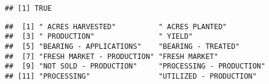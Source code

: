\documentclass[
]{article}
\newenvironment{Shaded}{\begin{snugshade}}{\end{snugshade}}
\newcommand{\CommentTok}[1]{\textcolor[rgb]{0.56,0.35,0.01}{\textit{#1}}}
\newcommand{\DataTypeTok}[1]{\textcolor[rgb]{0.13,0.29,0.53}{#1}}
\newcommand{\DecValTok}[1]{\textcolor[rgb]{0.00,0.00,0.81}{#1}}
\newcommand{\KeywordTok}[1]{\textcolor[rgb]{0.13,0.29,0.53}{\textbf{#1}}}
\newcommand{\NormalTok}[1]{#1}
\newcommand{\OperatorTok}[1]{\textcolor[rgb]{0.81,0.36,0.00}{\textbf{#1}}}
\newcommand{\StringTok}[1]{\textcolor[rgb]{0.31,0.60,0.02}{#1}}
\begin{document}
\begin{verbatim}
## [1] TRUE
\end{verbatim}

\begin{Shaded}
\end{Shaded}

\begin{verbatim}
##  [1] " ACRES HARVESTED"          " ACRES PLANTED"           
##  [3] " PRODUCTION"               " YIELD"                   
##  [5] "BEARING - APPLICATIONS"    "BEARING - TREATED"        
##  [7] "FRESH MARKET - PRODUCTION" "FRESH MARKET"             
##  [9] "NOT SOLD - PRODUCTION"     "PROCESSING - PRODUCTION"  
## [11] "PROCESSING"                "UTILIZED - PRODUCTION"
\end{verbatim}
\end{document}
